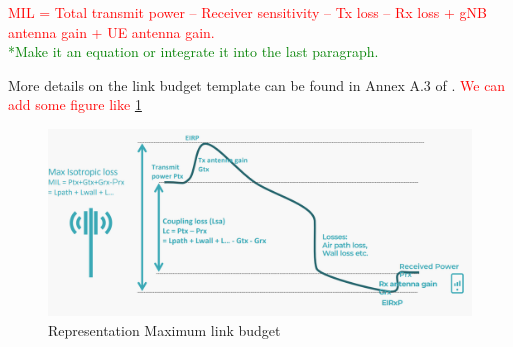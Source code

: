 \documentclass[]{IEEEtran}
\newcommand{\CAREPL}[2]{\textcolor{red}{#1}\textcolor{green}{#2}}
\begin{document}
\CAREPL{MIL = Total transmit power – Receiver sensitivity – Tx loss – Rx loss + gNB antenna gain + UE antenna gain.\\}{*Make it an equation or integrate it into the last paragraph.}

More details on the link budget template can be found in Annex A.3 of \cite{3gpp_study_nodate-3_38.830}. \textcolor{red}{We can add some figure like \ref{fig:MIL-diagram}}

\begin{figure}
    \centering
    \includegraphics[width=\linewidth]{Pictures/Link budget representation.png}
    \caption{Representation Maximum link budget}
    \label{fig:MIL-diagram}
\end{figure}
\end{document}
